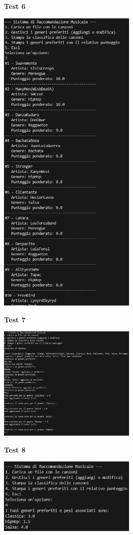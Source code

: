 \documentclass[a4paper,11pt]{article}
\begin{document}
\newpage
\begin{center}
    \textbf{Test 6}
    \par
    \vspace{0.5cm}
    \includegraphics[width=0.5\textwidth]{htest6}
\end{center}

\newpage
\begin{center}
    \textbf{Test 7}
    \par
    \vspace{0.5cm}
    \includegraphics[width=0.5\textwidth]{htest7}
\end{center}
\begin{center}
    \textbf{Test 8}
    \par
    \vspace{0.5cm}
    \includegraphics[width=0.5\textwidth]{htest8}
\end{center}
\end{document}
